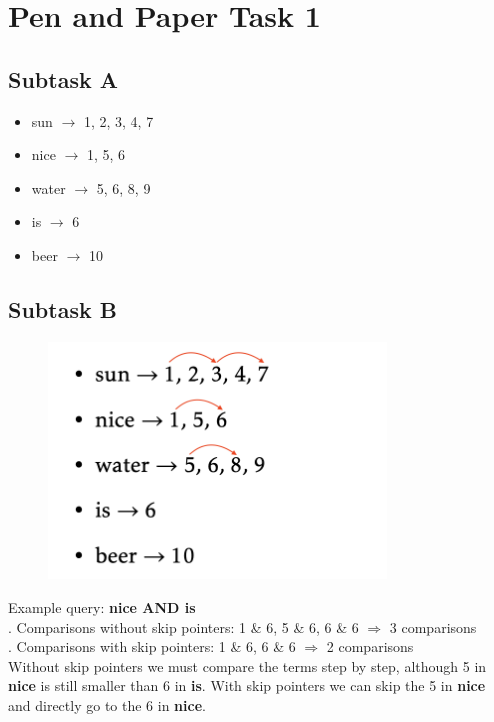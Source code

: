 \documentclass[a4paper]{scrartcl}
\begin{document}
    
\section*{Pen and Paper Task 1}
    
\subsection*{Subtask A}

\begin{itemize}
    \item sun $\rightarrow$ 1, 2, 3, 4, 7
    \item nice $\rightarrow$ 1, 5, 6
    \item water $\rightarrow$ 5, 6, 8, 9
    \item is $\rightarrow$ 6
    \item beer $\rightarrow$ 10
\end{itemize}

\subsection*{Subtask B}
\begin{figure}[ht]
  \begin{center}
    \includegraphics[width=0.8\textwidth]{img/skip_pointers.png}
  \end{center}
\end{figure}
Example query: \textbf{nice AND is}\\
. Comparisons without skip pointers: 1 \& 6, 5 \& 6, 6 \& 6 $\Rightarrow$ 3 comparisons\\
. Comparisons with skip pointers: 1 \& 6, 6 \& 6 $\Rightarrow$ 2 comparisons\\
\indent Without skip pointers we must compare the terms step by step, although 5 in \textbf{nice} is still smaller than 6 in \textbf{is}. With skip pointers we can skip the 5 in \textbf{nice} and directly go to the 6 in \textbf{nice}.\\
\end{document}
